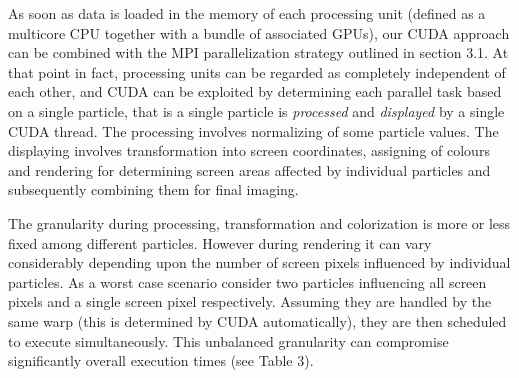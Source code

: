 \documentclass[1p,times]{elsarticle}
\begin{document}
As soon as data is loaded in the memory of each processing unit (defined as a multicore CPU together with a bundle of associated GPUs), our CUDA approach can be combined with the MPI parallelization strategy outlined in section 3.1. At that point in fact, processing units can be regarded as completely independent of each other, and CUDA can be exploited by determining each parallel task based on a single particle, that is a single particle is {\it processed} and {\it displayed} by a single CUDA thread. 
The processing involves normalizing of some particle values. 
The displaying involves transformation into screen coordinates, assigning of colours and rendering for determining screen areas affected by individual particles and subsequently combining them for final imaging.

The granularity during processing, transformation and colorization is more or 
less fixed among different particles. However during rendering it 
can vary considerably depending upon the number of screen pixels influenced 
by individual particles. As a worst case scenario consider two particles influencing 
all screen pixels and a single screen pixel respectively. 
Assuming they are handled by the same warp (this is determined by CUDA automatically), 
they are then scheduled to execute simultaneously. This unbalanced granularity 
can compromise significantly overall execution times (see Table 3).

\end{document}
